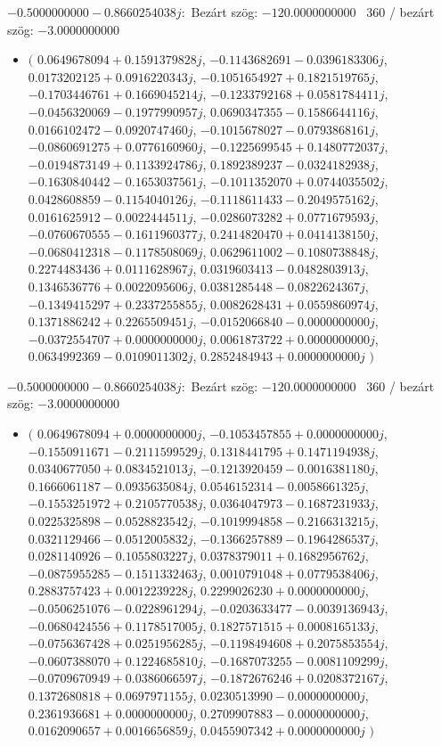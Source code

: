 \documentclass[14pt,a4paper]{article}
\begin{document}
$-0.5000000000-0.8660254038j$:\
Bezárt szög: $-120.0000000000$ \
360 / bezárt szög: $-3.0000000000$\
\begin{itemize}
\item
$\big($
$0.0649678094+0.1591379828j$, $-0.1143682691-0.0396183306j$, $0.0173202125+0.0916220343j$, $-0.1051654927+0.1821519765j$, $-0.1703446761+0.1669045214j$, $-0.1233792168+0.0581784411j$, $-0.0456320069-0.1977990957j$, $0.0690347355-0.1586644116j$, $0.0166102472-0.0920747460j$, $-0.1015678027-0.0793868161j$, $-0.0860691275+0.0776160960j$, $-0.1225699545+0.1480772037j$, $-0.0194873149+0.1133924786j$, $0.1892389237-0.0324182938j$, $-0.1630840442-0.1653037561j$, $-0.1011352070+0.0744035502j$, $0.0428608859-0.1154040126j$, $-0.1118611433-0.2049575162j$, $0.0161625912-0.0022444511j$, $-0.0286073282+0.0771679593j$, $-0.0760670555-0.1611960377j$, $0.2414820470+0.0414138150j$, $-0.0680412318-0.1178508069j$, $0.0629611002-0.1080738848j$, $0.2274483436+0.0111628967j$, $0.0319603413-0.0482803913j$, $0.1346536776+0.0022095606j$, $0.0381285448-0.0822624367j$, $-0.1349415297+0.2337255855j$, $0.0082628431+0.0559860974j$, $0.1371886242+0.2265509451j$, $-0.0152066840-0.0000000000j$, $-0.0372554707+0.0000000000j$, $0.0061873722+0.0000000000j$, $0.0634992369-0.0109011302j$, $0.2852484943+0.0000000000j$
$\big)$
\end{itemize}
$-0.5000000000-0.8660254038j$:\
Bezárt szög: $-120.0000000000$ \
360 / bezárt szög: $-3.0000000000$\
\begin{itemize}
\item
$\big($
$0.0649678094+0.0000000000j$, $-0.1053457855+0.0000000000j$, $-0.1550911671-0.2111599529j$, $0.1318441795+0.1471194938j$, $0.0340677050+0.0834521013j$, $-0.1213920459-0.0016381180j$, $0.1666061187-0.0935635084j$, $0.0546152314-0.0058661325j$, $-0.1553251972+0.2105770538j$, $0.0364047973-0.1687231933j$, $0.0225325898-0.0528823542j$, $-0.1019994858-0.2166313215j$, $0.0321129466-0.0512005832j$, $-0.1366257889-0.1964286537j$, $0.0281140926-0.1055803227j$, $0.0378379011+0.1682956762j$, $-0.0875955285-0.1511332463j$, $0.0010791048+0.0779538406j$, $0.2883757423+0.0012239228j$, $0.2299026230+0.0000000000j$, $-0.0506251076-0.0228961294j$, $-0.0203633477-0.0039136943j$, $-0.0680424556+0.1178517005j$, $0.1827571515+0.0008165133j$, $-0.0756367428+0.0251956285j$, $-0.1198494608+0.2075853554j$, $-0.0607388070+0.1224685810j$, $-0.1687073255-0.0081109299j$, $-0.0709670949+0.0386066597j$, $-0.1872676246+0.0208372167j$, $0.1372680818+0.0697971155j$, $0.0230513990-0.0000000000j$, $0.2361936681+0.0000000000j$, $0.2709907883-0.0000000000j$, $0.0162090657+0.0016656859j$, $0.0455907342+0.0000000000j$
$\big)$
\end{itemize}
\end{document}
